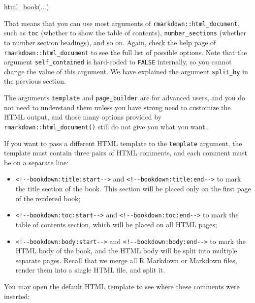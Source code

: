 \documentclass[
  12pt,
]{krantz}
\newenvironment{Shaded}{\begin{snugshade}}{\end{snugshade}}
\newcommand{\FunctionTok}[1]{\textcolor[rgb]{0.00,0.00,0.00}{#1}}
\newcommand{\NormalTok}[1]{#1}
\providecommand{\tightlist}{%
  \setlength{\itemsep}{0pt}\setlength{\parskip}{0pt}}
\theoremstyle{definition}
\theoremstyle{definition}
\theoremstyle{definition}
\theoremstyle{definition}
\theoremstyle{remark}
\begin{document}
\begin{Shaded}
\begin{Highlighting}[]
\FunctionTok{html\_book}\NormalTok{(...)}
\end{Highlighting}
\end{Shaded}

That means that you can use most arguments of \texttt{rmarkdown::html\_document}, such as \texttt{toc} (whether to show the table of contents), \texttt{number\_sections} (whether to number section headings), and so on. Again, check the help page of \texttt{rmarkdown::html\_document} to see the full list of possible options. Note that the argument \texttt{self\_contained} is hard-coded to \texttt{FALSE} internally, so you cannot change the value of this argument. We have explained the argument \texttt{split\_by} in the previous section.

The arguments \texttt{template} and \texttt{page\_builder} are for advanced users, and you do not need to understand them unless you have strong need to customize the HTML output, and those many options provided by \texttt{rmarkdown::html\_document()} still do not give you what you want.

If you want to pass a different HTML template to the \texttt{template} argument, the template must contain three pairs of HTML comments, and each comment must be on a separate line:

\begin{itemize}
\tightlist
\item
  \texttt{\textless{}!-\/-bookdown:title:start-\/-\textgreater{}} and \texttt{\textless{}!-\/-bookdown:title:end-\/-\textgreater{}} to mark the title section of the book. This section will be placed only on the first page of the rendered book;
\item
  \texttt{\textless{}!-\/-bookdown:toc:start-\/-\textgreater{}} and \texttt{\textless{}!-\/-bookdown:toc:end-\/-\textgreater{}} to mark the table of contents section, which will be placed on all HTML pages;
\item
  \texttt{\textless{}!-\/-bookdown:body:start-\/-\textgreater{}} and \texttt{\textless{}!-\/-bookdown:body:end-\/-\textgreater{}} to mark the HTML body of the book, and the HTML body will be split into multiple separate pages. Recall that we merge all R Markdown or Markdown files, render them into a single HTML file, and split it.
\end{itemize}

You may open the default HTML template to see where these comments were inserted:
\end{document}
